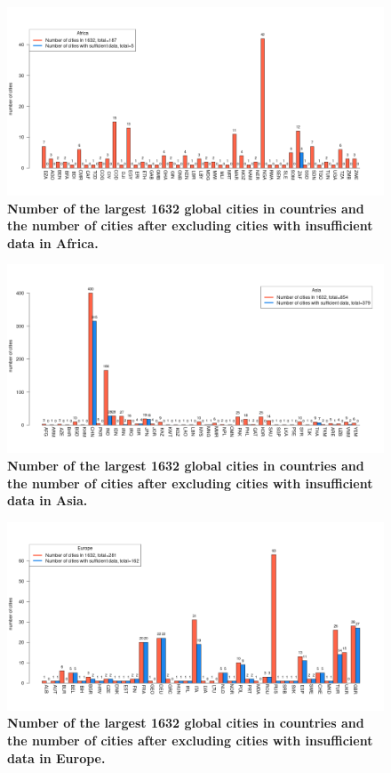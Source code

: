 \documentclass[preprint,10pt]{elsarticle} %
\begin{document}
\begin{figure}
\centering
\includegraphics[trim={ 0 35 25 50 },clip,scale=0.45]{Images/Africa_cities.png}
\caption{\bf Number of the largest 1632 global cities in countries and the number of cities after excluding cities with insufficient data in Africa.}
 \label{fig:africa}
\end{figure}

\begin{figure}
\centering
\includegraphics[trim={ 0 35 25 50 },clip,scale=0.45]{Images/Asia_cities.png}
\caption{\bf Number of the largest 1632 global cities in countries and the number of cities after excluding cities with insufficient data in Asia.}
 \label{fig:asia}
\end{figure}

\begin{figure}
\centering
\includegraphics[trim={ 0 35 25 50 },clip,scale=0.45]{Images/Europe_cities.png}
\caption{\bf Number of the largest 1632 global cities in countries and the number of cities after excluding cities with insufficient data in Europe.}
 \label{fig:europe}
\end{figure}
\end{document}
